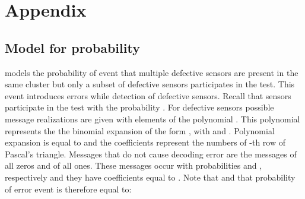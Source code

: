 \documentclass[journal]{IEEEtran}
\begin{document}



\appendix \section{Appendix}\label{sec:appendix}
\subsection{Model for probability }\label{ssec:p(q|m)}

 models the probability of event that multiple defective sensors are present in the same cluster but only a subset of defective sensors participates in the test. This event introduces errors while detection of defective sensors. Recall that sensors participate in the test with the probability . For  defective sensors possible message realizations are given with elements of the polynomial . This polynomial represents the the binomial expansion of the form , with  and . Polynomial expansion is equal to  and the coefficients  represent the numbers of -th row of Pascal's triangle. Messages that do not cause decoding error are the messages of all zeros and of all ones. These messages occur with probabilities  and , respectively and they have coefficients equal to . Note that  and that probability of error event is therefore equal to:
\end{document}
